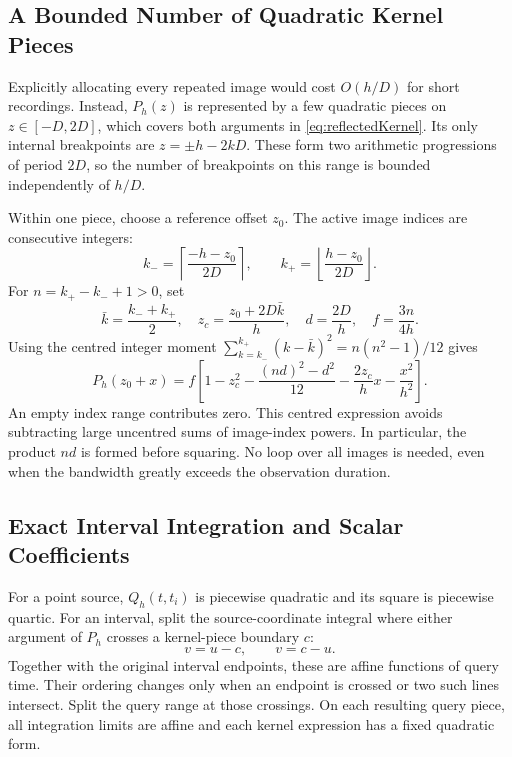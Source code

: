 \documentclass[11pt,a4paper]{article}
\begin{document}
\subsection{A Bounded Number of Quadratic Kernel Pieces}
\label{sec:adaptivePolynomials}

Explicitly allocating every repeated image would cost $O(h/D)$ for short
recordings.  Instead, $P_h(z)$ is represented by a few quadratic pieces
on $z\in[-D,2D]$, which covers both arguments in
\eqref{eq:reflectedKernel}.  Its only internal breakpoints are
$z=\pm h-2kD$.  These form two arithmetic progressions of period $2D$,
so the number of breakpoints on this range is bounded independently of
$h/D$.

Within one piece, choose a reference offset $z_0$.  The active image
indices are consecutive integers:
\begin{equation}
  k_- =\left\lceil\frac{-h-z_0}{2D}\right\rceil,
  \qquad
  k_+ =\left\lfloor\frac{h-z_0}{2D}\right\rfloor.
\end{equation}
For $n=k_+-k_-+1>0$, set
\begin{equation}
  \bar k=\frac{k_-+k_+}{2},\quad
  z_c=\frac{z_0+2D\bar k}{h},\quad
  d=\frac{2D}{h},\quad f=\frac{3n}{4h}.
\end{equation}
Using the centred integer moment
$\sum_{k=k_-}^{k_+}(k-\bar k)^2=n(n^2-1)/12$ gives
\begin{equation}
  P_h(z_0+x)
   =f\left[1-z_c^2-\frac{(nd)^2-d^2}{12}
              -\frac{2z_c}{h}x-\frac{x^2}{h^2}\right].
  \label{eq:periodicCoefficients}
\end{equation}
An empty index range contributes zero.  This centred expression avoids
subtracting large uncentred sums of image-index powers.  In particular,
the product $nd$ is formed before squaring.  No loop over all images is
needed, even when the bandwidth greatly exceeds the observation duration.

\subsection{Exact Interval Integration and Scalar Coefficients}

For a point source, $Q_h(t,t_i)$ is piecewise quadratic and its square is
piecewise quartic.  For an interval, split the source-coordinate integral
where either argument of $P_h$ crosses a kernel-piece boundary $c$:
\begin{equation}
  v=u-c,\qquad v=c-u.
\end{equation}
Together with the original interval endpoints, these are affine functions
of query time.  Their ordering changes only when an endpoint is crossed
or two such lines intersect.  Split the query range at those crossings.
On each resulting query piece, all integration limits are affine and each
kernel expression has a fixed quadratic form.
\end{document}
